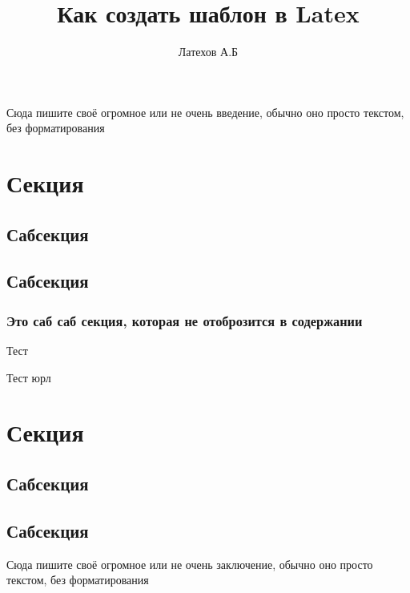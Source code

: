 
\def\institute{Автоматики и информационных технологий}
\def\kafedra{Электроники, телекоммуникации и космических технологий}
\def\tipraboty{СРСП}
\author{Латехов А.Б}
\title{Как создать шаблон в Latex}
\def\prepod{Гончаров А.Б}
\def\shifrop{0A00000}

	
	
	\tableofcontents
	
	\newpage
	Сюда пишите своё огромное или не очень введение, обычно оно просто текстом, без форматирования
	\newpage
	
	\section{Секция}
	\subsection{Сабсекция}
	\subsection{Сабсекция}
	\subsubsection{Это саб саб секция, которая не отоброзится в содержании}
	Тест\cite{PinillaToro2019}
	
	Тест юрл
	\newpage
	
	\section{Секция}
	\subsection{Сабсекция}
	\subsection{Сабсекция}
	\newpage
	
	Сюда пишите своё огромное или не очень заключение, обычно оно просто текстом, без форматирования
	
	\newpage
	\printbibliography[heading=su]

